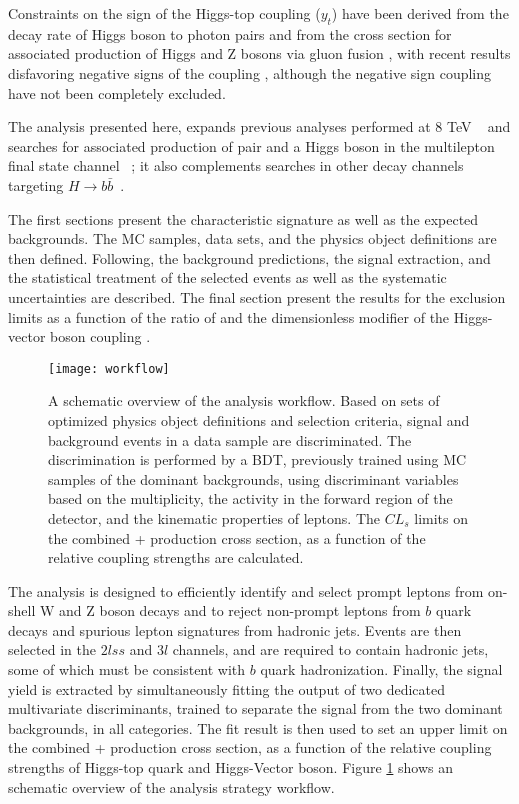 Constraints on the sign of the Higgs-top coupling ($y_t$) have been derived from the decay rate of Higgs boson to photon pairs \cite{biswas} and from the cross section for associated production of Higgs and Z bosons via gluon fusion \cite{hespel}, with recent results disfavoring negative signs of the coupling \cite{cms_ht_couplings,comb_ht_couplings,diboson}, although the negative sign coupling have not been completely excluded.

The analysis presented here, expands previous analyses performed at 8 TeV ~\cite{Khachatryan_2015,CMS_AN_2014-140} and searches for associated production of \ttbar pair and a Higgs boson in the multilepton final state channel ~\cite{CMS_AN_2016-211}; it also complements searches in other decay channels targeting $H\to b\bar{b}$~\cite{CMS_PAS_HIG_16-019}.

The first sections present the characteristic \tHq signature as well as the expected backgrounds. The MC samples, data sets, and the physics object definitions are then defined. Following, the background predictions, the signal extraction, and the statistical treatment of the selected events as well as the systematic uncertainties are described. The final section present the results for the exclusion limits as a function of the ratio of \Ct and the dimensionless modifier of the Higgs-vector boson coupling \CV.  

\begin{figure}[!h]
\begin{center}
\texttt{[image: workflow]}
\end{center}
\caption[Analysis strategy workflow]{A schematic overview of the analysis workflow. Based on sets of optimized physics object definitions and selection criteria, signal and background events in a data sample are discriminated. The discrimination is performed by a BDT, previously trained using MC samples of the dominant backgrounds, using discriminant variables based on the \bjet multiplicity, the activity in the forward region of the detector, and the kinematic properties of leptons. The $CL_s$ limits on the combined \ttH + \tH production cross section, as a function of the relative coupling strengths are calculated. }
\label{fig:workflow}
\end{figure}

The analysis is designed to efficiently identify and select prompt leptons from on-shell W and Z boson decays and to reject non-prompt leptons from $b$ quark decays and spurious lepton signatures from hadronic jets. Events are then selected in the $2lss$ and $3l$ channels, and are required to contain hadronic jets, some of which must be consistent with $b$ quark hadronization. Finally, the signal yield is extracted by simultaneously fitting the output of two dedicated multivariate discriminants, trained to separate the \tHq signal from the two dominant backgrounds, in all categories. The fit result is then used to set an upper limit on the combined \ttH + \tH production cross section, as a function of the relative coupling strengths of Higgs-top quark and Higgs-Vector boson. Figure \ref{fig:workflow} shows an schematic overview of the analysis strategy workflow. 

